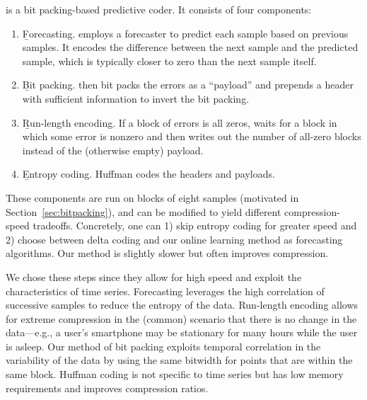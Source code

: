 \minesp is a bit packing-based predictive coder. It consists of four components:
\begin{enumerate}
\itemsep0em
\item \b{Forecasting.} \minesp employs a forecaster to predict each sample based on previous samples. It encodes the difference between the next sample and the predicted sample, which is typically closer to zero than the next sample itself.
\item \b{Bit packing.} \minesp then bit packs the errors as a ``payload'' and prepends a header with sufficient information to invert the bit packing.
\item \b{Run-length encoding.} If a block of errors is all zeros, \minesp waits for a block in which some error is nonzero and then writes out the number of all-zero blocks instead of the (otherwise empty) payload.
\item \b{Entropy coding.} \minesp Huffman codes the headers and payloads.
\end{enumerate}

These components are run on blocks of eight samples (motivated in Section~\ref{sec:bitpacking}), and can be modified to yield different compression-speed tradeoffs. Concretely, one can 1) skip entropy coding for greater speed and 2) choose between delta coding and our online learning method as forecasting algorithms. Our method is slightly slower but often improves compression.

We chose these steps since they allow for high speed and exploit the characteristics of time series. Forecasting leverages the high correlation of successive samples to reduce the entropy of the data. Run-length encoding allows for extreme compression in the (common) scenario that there is no change in the data---e.g., a user's smartphone may be stationary for many hours while the user is asleep. Our method of bit packing exploits temporal correlation in the variability of the data by using the same bitwidth for points that are within the same block. Huffman coding is not specific to time series but has low memory requirements and improves compression ratios.



